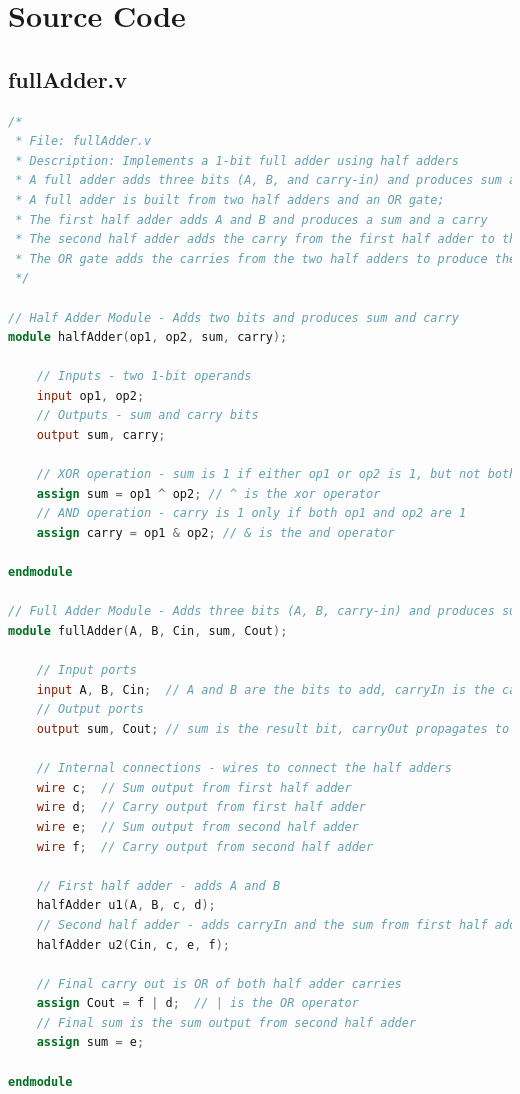 \documentclass[a4paper,12pt]{article}
\begin{document}
\newpage

\section*{Source Code}
\subsection*{fullAdder.v}
\begin{lstlisting}[language=Verilog]
/*
 * File: fullAdder.v
 * Description: Implements a 1-bit full adder using half adders
 * A full adder adds three bits (A, B, and carry-in) and produces sum and carry-out
 * A full adder is built from two half adders and an OR gate; 
 * The first half adder adds A and B and produces a sum and a carry
 * The second half adder adds the carry from the first half adder to the carry-in
 * The OR gate adds the carries from the two half adders to produce the final carry-out
 */

// Half Adder Module - Adds two bits and produces sum and carry
module halfAdder(op1, op2, sum, carry);

    // Inputs - two 1-bit operands
    input op1, op2;
    // Outputs - sum and carry bits
    output sum, carry;
    
    // XOR operation - sum is 1 if either op1 or op2 is 1, but not both
    assign sum = op1 ^ op2; // ^ is the xor operator
    // AND operation - carry is 1 only if both op1 and op2 are 1
    assign carry = op1 & op2; // & is the and operator
    
endmodule

// Full Adder Module - Adds three bits (A, B, carry-in) and produces sum and carry-out
module fullAdder(A, B, Cin, sum, Cout);

    // Input ports
    input A, B, Cin;  // A and B are the bits to add, carryIn is the carry from previous addition
    // Output ports
    output sum, Cout; // sum is the result bit, carryOut propagates to next addition
    
    // Internal connections - wires to connect the half adders
    wire c;  // Sum output from first half adder
    wire d;  // Carry output from first half adder
    wire e;  // Sum output from second half adder
    wire f;  // Carry output from second half adder
    
    // First half adder - adds A and B
    halfAdder u1(A, B, c, d);
    // Second half adder - adds carryIn and the sum from first half adder
    halfAdder u2(Cin, c, e, f);
    
    // Final carry out is OR of both half adder carries
    assign Cout = f | d;  // | is the OR operator
    // Final sum is the sum output from second half adder
    assign sum = e;
    
endmodule
\end{lstlisting}
\end{document}
